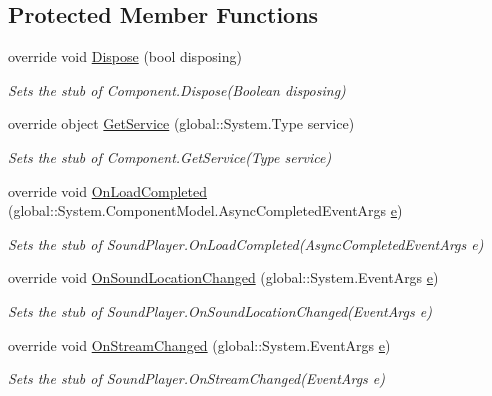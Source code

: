 \subsection*{Protected Member Functions}
\begin{DoxyCompactItemize}
\item 
override void \hyperlink{class_system_1_1_media_1_1_fakes_1_1_stub_sound_player_a4da63ca3f935ce84fc1e7ee38427ced4}{Dispose} (bool disposing)
\begin{DoxyCompactList}\small\item\em Sets the stub of Component.\-Dispose(\-Boolean disposing)\end{DoxyCompactList}\item 
override object \hyperlink{class_system_1_1_media_1_1_fakes_1_1_stub_sound_player_afe75345c7be8d914c050bff1520fd6eb}{Get\-Service} (global\-::\-System.\-Type service)
\begin{DoxyCompactList}\small\item\em Sets the stub of Component.\-Get\-Service(\-Type service)\end{DoxyCompactList}\item 
override void \hyperlink{class_system_1_1_media_1_1_fakes_1_1_stub_sound_player_ac666b5a86fea10e74eeb083bafe981e5}{On\-Load\-Completed} (global\-::\-System.\-Component\-Model.\-Async\-Completed\-Event\-Args \hyperlink{jquery-1_810_82_8min_8js_a2c038346d47955cbe2cb91e338edd7e1}{e})
\begin{DoxyCompactList}\small\item\em Sets the stub of Sound\-Player.\-On\-Load\-Completed(\-Async\-Completed\-Event\-Args e)\end{DoxyCompactList}\item 
override void \hyperlink{class_system_1_1_media_1_1_fakes_1_1_stub_sound_player_ab540c39511cccf79e0e0aa8a7866941e}{On\-Sound\-Location\-Changed} (global\-::\-System.\-Event\-Args \hyperlink{jquery-1_810_82_8min_8js_a2c038346d47955cbe2cb91e338edd7e1}{e})
\begin{DoxyCompactList}\small\item\em Sets the stub of Sound\-Player.\-On\-Sound\-Location\-Changed(\-Event\-Args e)\end{DoxyCompactList}\item 
override void \hyperlink{class_system_1_1_media_1_1_fakes_1_1_stub_sound_player_aaf065d72ed936a167af51a7374842174}{On\-Stream\-Changed} (global\-::\-System.\-Event\-Args \hyperlink{jquery-1_810_82_8min_8js_a2c038346d47955cbe2cb91e338edd7e1}{e})
\begin{DoxyCompactList}\small\item\em Sets the stub of Sound\-Player.\-On\-Stream\-Changed(\-Event\-Args e)\end{DoxyCompactList}\end{DoxyCompactItemize}

